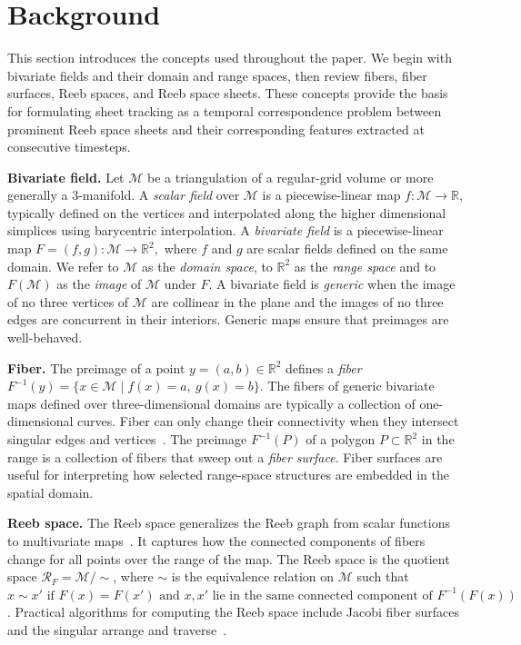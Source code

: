 \documentclass{vgtc}                          %
\newcommand{\R}{\mathbb{R}}
\newcommand{\Domain}{\mathcal{M}}
\newcommand{\myparagraph}[1]{\vspace{1mm} \noindent \textbf{#1}}
\begin{document}
\section{Background}
This section introduces the concepts used throughout the paper. We begin with bivariate fields and their domain and range spaces, then review fibers, fiber surfaces, Reeb spaces, and Reeb space sheets. These concepts provide the basis for formulating sheet tracking as a temporal correspondence problem between prominent Reeb space sheets and their corresponding features extracted at consecutive timesteps.

\myparagraph{Bivariate field.} Let $\Domain$ be a triangulation of a regular-grid volume or more generally a 3-manifold.
A \textit{scalar field} over $\Domain$ is a piecewise-linear map $f:\Domain \to \R$, typically defined on the vertices and interpolated along the higher dimensional simplices using barycentric interpolation.
A \textit{bivariate field} is a piecewise-linear map $F=(f,g):\Domain \to \R^2,$
where $f$ and $g$ are scalar fields defined on the same domain.
We refer to $\Domain$ as the \textit{domain space}, to $\R^2$ as the \textit{range space} and to $F(\Domain)$ as the \textit{image} of $\Domain$ under $F$.
A bivariate field is \textit{generic} when the image of no three vertices of $\Domain$ are collinear in the plane and the images of no three edges are concurrent in their interiors.
Generic maps ensure that preimages are well-behaved.

\myparagraph{Fiber.} The preimage of a point $y=(a,b)\in\R^2$ defines a \emph{fiber}
$F^{-1}(y)=\{x \in \Domain \mid f(x)=a,\ g(x)=b\}$.
The fibers of generic bivariate maps defined over three-dimensional domains are typically a collection of one-dimensional curves.
Fiber can only change their connectivity when they intersect singular edges and vertices~\cite{hristovHypersweepsConvectiveClouds2022}.
The preimage $F^{-1}(P)$ of a polygon $P \subset \R^2$ in the range is a collection of fibers that sweep out a \emph{fiber surface}.
Fiber surfaces are useful for interpreting how selected range-space structures are embedded in the spatial domain.


\myparagraph{Reeb space.} The Reeb space generalizes the Reeb graph from scalar functions to multivariate maps~\cite{Edelsbrunner2008}.
It captures how the connected components of fibers change for all points over the range of the map.
The Reeb space is the quotient space $\mathcal{R}_F = \Domain/\sim$, where $\sim$ is the equivalence relation on $\Domain$ such that $x\sim x' \text{ if } F(x) = F(x') \text{ and }
x, x' \text{ lie in the same connected component of } F^{-1}(F(x))$.
Practical algorithms for computing the Reeb space include Jacobi fiber surfaces~\cite{Tierny2017b} and the singular arrange and traverse~\cite{Hristov2026SingularAA}.
\end{document}

